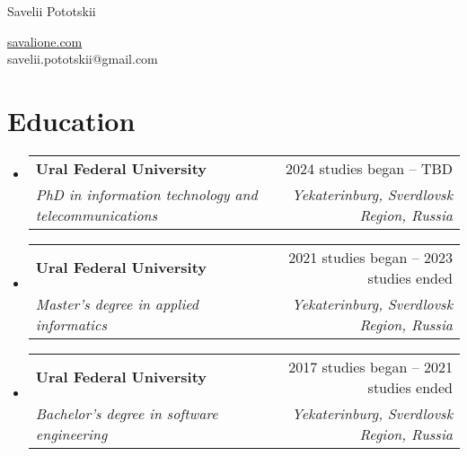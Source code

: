 \documentclass[letterpaper,11pt]{article}
\makeatletter
\newcommand{\resumeItem}[1]{
    \item{
                {#1 \vspace{-4pt}}
          }
}
\newcommand{\resumeSubheading}[4]{
    \vspace{-2pt}\item
    \begin{tabular*}{0.97\textwidth}[t]{l@{\extracolsep{\fill}}r}
        \textbf{#1} & #2 \\
        \textit{\small #3} & \textit{\small #4} \\
    \end{tabular*}\vspace{-10pt}
}
\newcommand{\resumeSubHeadingListStart}{\begin{itemize}[leftmargin=0.15in, label={}]}
\newcommand{\resumeSubHeadingListEnd}{\end{itemize}}
\newcommand{\resumeItemListStart}{\begin{itemize}}
\newcommand{\resumeItemListEnd}{\end{itemize}\vspace{-2pt}}
\makeatother
\begin{document}
\begin{center}
    {\LARGE Savelii Pototskii} \\ \vspace{0pt}
    \begin{multicols}{2}
        \begin{flushleft}
        \end{flushleft}

        \begin{flushright}
            \href{https://savalione.com}{savalione.com} \\

            \href{mailto:{savelii.pototskii@gmail.com}} \large{savelii.pototskii@gmail.com}
        \end{flushright}
    \end{multicols}
\end{center}

\section{Education}
\resumeSubHeadingListStart

\resumeSubheading
    {Ural Federal University}{2024 studies began -- TBD}
    {PhD in information technology and telecommunications}{Yekaterinburg, Sverdlovsk Region, Russia}
\resumeSubheading
    {Ural Federal University}{2021 studies began -- 2023 studies ended}
    {Master's degree in applied informatics}{Yekaterinburg, Sverdlovsk Region, Russia}
\resumeSubheading
    {Ural Federal University}{2017 studies began -- 2021 studies ended}
    {Bachelor's degree in software engineering}{Yekaterinburg, Sverdlovsk Region, Russia}

\resumeSubHeadingListEnd


\end{document}
